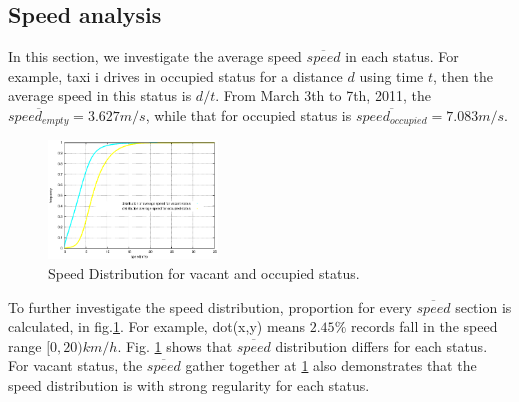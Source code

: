 \subsection{Speed analysis}
In this section, we investigate the average speed $\overline{speed}$ in each status. For example, taxi i drives in occupied status for a distance $d$ using time $t$, then the average speed in this status is $d/t$.
From March 3th to 7th, 2011, the $\overline{speed_{empty}} = 3.627 m/s$, while that for occupied status is $\overline{speed_{occupied}}=7.083 m/s$. 

\begin{figure}
\centering
\includegraphics[width=0.4\textwidth]{figures_201103/assumption/speeddis.eps}
\caption{Speed Distribution for vacant and occupied status.}\label{figure_speed_distribution}
\end{figure}

To further investigate the speed distribution, proportion for every $\overline{speed}$ section is calculated, in fig.\ref{figure_speed_distribution}. For example, dot(x,y) means $2.45\%$ records fall in the speed range $[0,20)km/h$.
Fig. \ref{figure_speed_distribution} shows that $\overline{speed}$ distribution differs for each status. For vacant status, the $\overline{speed}$ gather together at  \ref{figure_speed_distribution} also demonstrates that the speed distribution is with strong regularity for each status.


